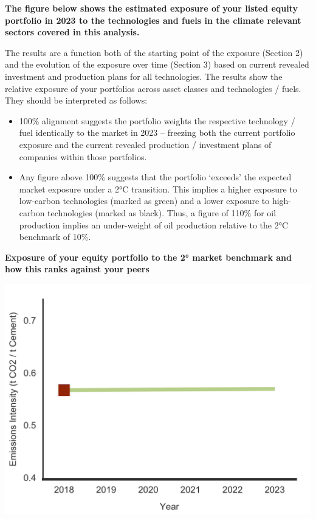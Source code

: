 \documentclass[10pt,table,a4]{article}\usepackage[]{graphicx}\usepackage[]{color}
\begin{document}
	\begin{multicols}{2}
		\textbf{The figure below shows the estimated exposure of your listed equity portfolio in 2023 to the technologies and fuels in the climate relevant sectors covered in this analysis. }
		
		The results are a function both of the starting point of the exposure (Section 2) and the evolution of the exposure over time (Section 3) based on current revealed investment and production plans for all technologies. The results show the relative exposure of your portfolios across asset classes and technologies / fuels. They should be interpreted as follows:
		
		\begin{itemize}
			\item{100\% alignment suggests the portfolio weights the respective technology / fuel identically to the market in 2023 – freezing both the current portfolio exposure and the current revealed production / investment plans of companies within those portfolios.}
			
			\item{Any figure above 100\% suggests that the portfolio ‘exceeds’ the expected market exposure under a 2°C transition. This implies a higher exposure to low-carbon technologies (marked as green) and a lower exposure to high-carbon technologies (marked as black). Thus, a figure of 110\% for oil production implies an under-weight of oil production relative to the 2°C benchmark of 10\%. }
			
		\end{itemize}
	\end{multicols}
	
	\textbf{Exposure of your equity portfolio to the 2° market benchmark and how this ranks against your peers}
	
	\begin{center}
		\includegraphics[trim = {0 0cm 0 0},width=1\linewidth]{CAFigures/Fig30}
	\end{center}
	
\end{document}
